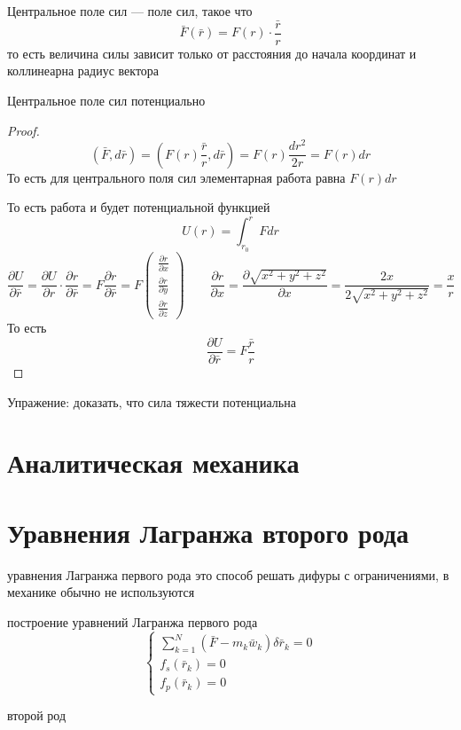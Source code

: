 \documentclass[crop=false]{standalone}
\begin{document}
\Def Центральное поле сил — поле сил, такое что
\[\bar F(\bar r) = F(r) \cdot \frac{\bar r}{r}\]
то есть величина силы зависит только от расстояния до начала координат и коллинеарна радиус вектора

\noindent \keypoint Центральное поле сил потенциально
\begin{proof}
    \[(\bar F, d \bar r) = \left(F(r) \frac{\bar r}{r}, d \bar r\right) = F(r) \frac{d r^2}{2 r} = F(r) d r\]
    То есть для центрального поля сил элементарная работа равна $F(r) dr$
    
    То есть работа и будет потенциальной функцией
    \[U(r) = \int_{r_0}^r F d r\]
    \[\frac{\partial U}{\partial \bar r} = \frac{\partial U}{\partial r} \cdot \frac{\partial r}{\partial \bar r} = F \frac{\partial r}{\partial \bar r} = F \begin{pmatrix}
        \frac{\partial r}{\partial x} \\ \frac{\partial r}{\partial y} \\ \frac{\partial r}{\partial z}
    \end{pmatrix} \qquad \frac{\partial r}{\partial x} = \frac{\partial \sqrt{x^2 + y^2 + z^2}}{\partial x} = \frac{2 x}{2 \sqrt{x^2 + y^2 + z^2}} = \frac{x}{r}\]
    То есть
    \[\frac{\partial U}{\partial \bar r} = F \frac{\bar r}{r}\]
\end{proof}
Упражение: доказать, что сила тяжести потенциальна

\section*{Аналитическая механика} %
\section{Уравнения Лагранжа второго рода}
\keypoint уравнения Лагранжа первого рода это способ решать дифуры с ограничениями, в механике обычно не используются

построение уравнений Лагранжа первого рода
\[
\begin{cases}
\sum_{k=1}^N (\bar F - m_k \bar w_k) \delta \bar r_k =0 \\ f_s(\bar r_k) = 0\\ f_p(\bar r_k) = 0
\end{cases}
\]

\noindent \keypoint второй род
\end{document}
